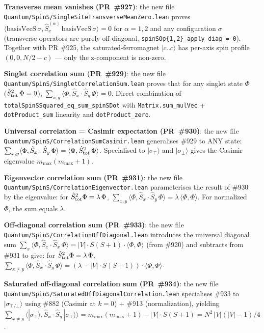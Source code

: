 \documentclass[a4paper,11pt]{article}
\begin{document}
\textbf{Transverse mean vanishes (PR~\#927)}: the new file
\texttt{Quantum/SpinS/SingleSiteTransverseMeanZero.lean} proves
$\langle\text{basisVecS}\,\sigma, \hat{S}^{(\alpha)}_x\,
\text{basisVecS}\,\sigma\rangle = 0$ for $\alpha = 1, 2$ and any
configuration $\sigma$ (transverse operators are purely off-diagonal,
\texttt{spinSOp\{1,2\}\_apply\_diag = 0}). Together with PR \#925,
the saturated-ferromagnet $|c..c\rangle$ has per-axis spin profile
$(0, 0, N/2-c)$ — only the z-component is non-zero.

\textbf{Singlet correlation sum (PR~\#929)}: the new file
\texttt{Quantum/SpinS/SingletCorrelationSum.lean} proves that for
any singlet state $\Phi$ ($\hat{S}_{\rm tot}^2\,\Phi = 0$),
$\sum_{x, y}\langle\Phi, \hat{S}_x\cdot\hat{S}_y\,\Phi\rangle = 0$.
Direct combination of \texttt{totalSpinSSquared\_eq\_sum\_spinSDot}
with \texttt{Matrix.sum\_mulVec} + \texttt{dotProduct\_sum} linearity
and \texttt{dotProduct\_zero}.

\textbf{Universal correlation = Casimir expectation (PR~\#930)}:
the new file \texttt{Quantum/SpinS/CorrelationSumCasimir.lean}
generalises \#929 to ANY state:
$\sum_{x, y}\langle\Phi, \hat{S}_x\cdot\hat{S}_y\,\Phi\rangle =
\langle\Phi, \hat{S}_{\rm tot}^2\,\Phi\rangle$. Specialised to
$|\sigma_\top\rangle$ and $|\sigma_\bot\rangle$ gives the Casimir
eigenvalue $m_{\max}(m_{\max}+1)$.

\textbf{Eigenvector correlation sum (PR~\#931)}: the new file
\texttt{Quantum/SpinS/CorrelationEigenvector.lean} parameterises
the result of \#930 by the eigenvalue: for $\hat{S}_{\rm tot}^2\Phi
= \lambda\,\Phi$, $\sum_{x, y}\langle\Phi, \hat{S}_x\cdot\hat{S}_y\,\Phi\rangle
= \lambda\,\langle\Phi, \Phi\rangle$. For normalized $\Phi$, the
sum equals $\lambda$.

\textbf{Off-diagonal correlation sum (PR~\#933)}: the new file
\texttt{Quantum/SpinS/CorrelationOffDiagonal.lean} introduces the
universal diagonal sum
$\sum_x\langle\Phi, \hat{S}_x\cdot\hat{S}_x\,\Phi\rangle =
|V|\cdot S(S+1)\cdot\langle\Phi,\Phi\rangle$ (from \#920) and
subtracts from \#931 to give: for $\hat{S}_{\rm tot}^2\Phi =
\lambda\,\Phi$, $\sum_{x\neq y}\langle\Phi, \hat{S}_x\cdot\hat{S}_y\,\Phi\rangle
= (\lambda - |V|\cdot S(S+1))\cdot\langle\Phi,\Phi\rangle$.

\textbf{Saturated off-diagonal correlation sum (PR~\#934)}: the
new file
\texttt{Quantum/SpinS/SaturatedOffDiagonalCorrelation.lean}
specialises \#933 to $|\sigma_{\top/\bot}\rangle$ using \#882
(Casimir at $k=0$) + \#913 (normalization), yielding
$\sum_{x\neq y}\langle|\sigma_\top\rangle,
\hat{S}_x\cdot\hat{S}_y\,|\sigma_\top\rangle\rangle =
m_{\max}(m_{\max}+1) - |V|\cdot S(S+1) = N^2\,|V|(|V|-1)/4$.
\end{document}
